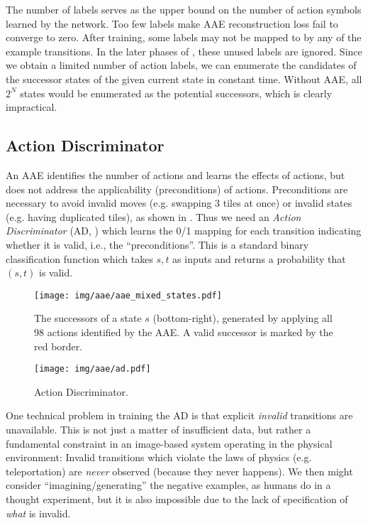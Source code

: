 \documentclass[11pt]{article}
\begin{document}
The number of labels serves as the upper bound on  the number of action symbols learned by the network.
Too few labels make AAE reconstruction loss fail to converge to zero.
After training, some labels may not be mapped to by any of the example transitions.
In the later phases of \latentplanner, these unused labels are ignored.
Since we obtain a limited number of action labels,
we can enumerate the candidates of the successor states of the given current state in constant time.
Without AAE, all $2^N$ states would be enumerated as the potential successors, which is clearly impractical.

\subsection{Action Discriminator}

An AAE identifies the number of actions and learns the effects of actions, but does not address the applicability (preconditions) of actions.
Preconditions are necessary to avoid invalid moves (e.g. swapping 3 tiles at once) or invalid states (e.g. having duplicated tiles), as shown in .
% 
Thus we need an \textit{Action Discriminator} (AD, ) which learns the 0/1 mapping for each transition indicating whether it is valid, i.e., the ``preconditions''. This is a standard binary classification function which takes $s,t$ as inputs and returns a probability that $(s,t)$ is valid.

\begin{figure}[tbp]
 \centering
 \texttt{[image: img/aae/aae\_mixed\_states.pdf]}
\caption{The successors of a state $s$ (bottom-right),
  generated by applying all 98 actions identified by the AAE.
 A valid successor is marked by the red border.}
 \label{fig:aae-mixed}
\end{figure}

\begin{figure}[tbp]
 \centering
 \texttt{[image: img/aae/ad.pdf]}
 \caption{Action Discriminator.}
 \label{fig:ad}
\end{figure}

One technical problem in training the AD is that explicit \emph{invalid} transitions are unavailable.
This is not just a matter of insufficient data, but rather a fundamental constraint in an image-based system operating in the physical environment: Invalid transitions which violate the laws of physics (e.g. teleportation) are \emph{never} observed (because they never happens).
We then might consider ``imagining/generating'' the negative examples, as humans do in a thought experiment, but it is also impossible due to the lack of specification of \emph{what} is invalid.
\end{document}
